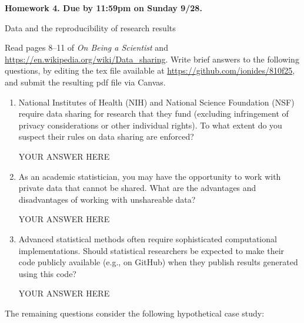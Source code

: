 \documentclass[12pt]{article}
\begin{document}
\begin{center}\bf
Homework 4. Due by 11:59pm on Sunday 9/28.

Data and the reproducibility of research results
\end{center}
Read pages 8--11 of {\em On Being a Scientist} and \url{https://en.wikipedia.org/wiki/Data_sharing}. Write brief answers to the following questions, by editing the tex file available at \url{https://github.com/ionides/810f25}, and submit the resulting pdf file via Canvas.

\begin{enumerate}

\item National Institutes of Health (NIH) and National Science Foundation (NSF) require data sharing for research that they fund (excluding infringement of privacy considerations or other individual rights). To what extent do you suspect their rules on data sharing are enforced?

YOUR ANSWER HERE

\item As an academic statistician, you may have the opportunity to work with private data that cannot be shared. What are the advantages and disadvantages of working with unshareable data?
  
YOUR ANSWER HERE
  

\item Advanced statistical methods often require sophisticated computational implementations. Should statistical researchers be expected to make their code publicly available (e.g., on GitHub) when they publish results generated using this code?

YOUR ANSWER HERE

\end{enumerate}
The remaining questions consider the following hypothetical case study:
\end{document}
